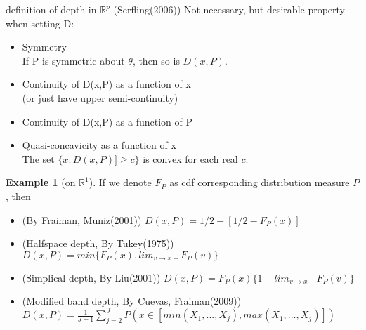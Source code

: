 \documentclass[aspectratio=169,ignorenonframetext,9pt]{beamer}
\theoremstyle{plain}
\theoremstyle{definition}
\newtheorem{exmp}{Example}[section]
\begin{document}
\begin{frame}{definition of depth in $\mathbb{R}^p$}
    (Serfling(2006)) Not necessary, but desirable property when setting D:
    \begin{itemize}
        \item Symmetry \\
            If P is symmetric about $\theta$, then so is $D(x,P)$.
        \item Continuity of D(x,P) as a function of x \\
            (or just have upper semi-continuity)
        \item Continuity of D(x,P) as a function of P
        \item Quasi-concavicity as a function of x \\
            The set $\{x:D(x,P)]\geq c\}$ is convex for each real $c$.
    \end{itemize}

    \begin{exmp} [on $\mathbb{R}^1$]
        If we denote $F_P$ as cdf corresponding distribution measure $P$, then
        \begin{itemize}
            \item (By Fraiman, Muniz(2001)) $D(x,P)=1/2-[1/2-F_P(x)]$
            \item (Halfspace depth, By Tukey(1975)) $D(x,P)=min\{F_P(x), lim_{v\rightarrow x-}F_P(v)\}$
            \item (Simplical depth, By Liu(2001)) $D(x,P)=F_P(x)\{1-lim_{v\rightarrow x-} F_P(v)\}$
            \item (Modified band depth, By Cuevas, Fraiman(2009)) $D(x,P)=\frac{1}{J-1}\sum_{j=2}^J P(x\in [min(X_1,...,X_j), max(X_1,...,X_j)])$
        \end{itemize}
    \end{exmp}
\end{frame}
\end{document}
